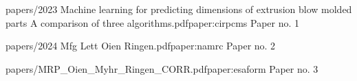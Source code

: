 
\begin{paper}{papers/2023 Machine learning for predicting dimensions of extrusion blow molded parts A comparison of three algorithms.pdf}{paper:cirpcms}
    Paper no. 1
    \begin{quote}
    \end{quote}
    
    
\end{paper}



\begin{paper}{papers/2024 Mfg Lett Oien Ringen.pdf}{paper:namrc}
    Paper no. 2
    \begin{quote}
    \end{quote}
    
    
\end{paper}


\begin{paper}{papers/MRP_Oien_Myhr_Ringen_CORR.pdf}{paper:esaform}
    Paper no. 3
    \begin{quote}
    \end{quote}
    
    
\end{paper}